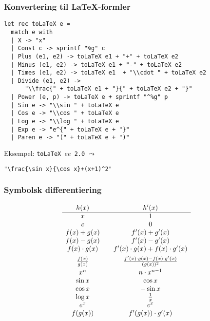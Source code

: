 \documentclass{beamer}
\begin{document}
\begin{frame}[fragile=singleslide]
\frametitle{Konvertering til \LaTeX-formler}

\renewcommand{\baselinestretch}{0.9}
\begin{verbatim}
let rec toLaTeX e =
  match e with
  | X -> "x"
  | Const c -> sprintf "%g" c
  | Plus (e1, e2) -> toLaTeX e1 + "+" + toLaTeX e2
  | Minus (e1, e2) -> toLaTeX e1 + "-" + toLaTeX e2
  | Times (e1, e2) -> toLaTeX e1  + "\\cdot " + toLaTeX e2
  | Divide (e1, e2) ->
      "\\frac{" + toLaTeX e1 + "}{" + toLaTeX e2 + "}"
  | Power (e, p) -> toLaTeX e + sprintf "^%g" p
  | Sin e -> "\\sin " + toLaTeX e
  | Cos e -> "\\cos " + toLaTeX e
  | Log e -> "\\log " + toLaTeX e
  | Exp e -> "e^{" + toLaTeX e + "}"
  | Paren e -> "(" + toLaTeX e + ")"
\end{verbatim}

Eksempel: \texttt{toLaTeX $ee$ 2.0} $\leadsto$

\begin{verbatim}
"\frac{\sin x}{\cos x}+(x+1)^2"
\end{verbatim}

\end{frame}

\begin{frame}%
\frametitle{Symbolsk differentiering}

\renewcommand{\arraystretch}{1.1}

\[\begin{array}{c@{\quad\quad}c}
h(x) & h'(x) \\\hline
x & 1 \\
c & 0 \\
f(x) + g(x) & f'(x) + g'(x) \\
f(x) - g(x) & f'(x) - g'(x) \\
f(x) \cdot g(x) & f'(x)\cdot g(x) + f(x)\cdot g'(x) \\[1ex]
\frac{f(x)}{g(x)} & \frac{f'(x)\cdot g(x) - f(x)\cdot g'(x)}{(g(x))^2}
\\[1ex]
x^n & n\cdot x^{n-1} \\
\sin x & \cos x \\
\cos x & - \sin x \\
\log x &  \frac{1}{x}\\
e^x & e^x \\
f(g(x)) & f'(g(x))\cdot g'(x)\\
\end{array}\]

\end{frame}
\end{document}
